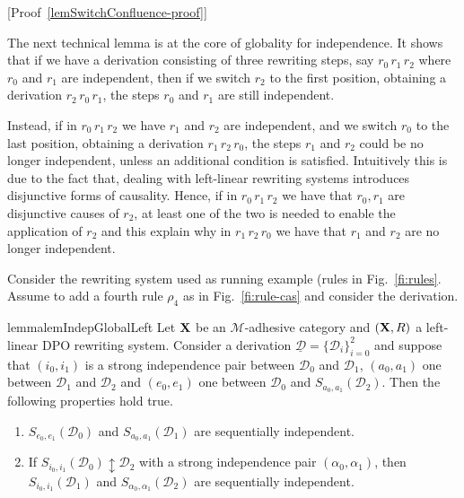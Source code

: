\documentclass[a4paper,UKenglish,cleveref,pdftex, thm-restate,numberwithinsect,anonymous]{lipics}
\def\R{\mathsf{R}}
\def\X{\textbf {\textup{X}}}
\newcommand{\dder}[1]{\mathscr{#1}}
\newcommand{\der}[1]{\underline{\dder{#1}}}
\newcommand{\seqind}{\ensuremath{\updownarrow}}
\begin{document}
[Proof~\ref{lemSwitchConfluence-proof}]


The next technical lemma is at the core of globality for independence. It shows that if we have a derivation consisting of three
rewriting steps, say $r_0\, r_1\, r_2$ where $r_0$ and $r_1$ are independent, then if we switch $r_2$ to the first position, 
obtaining a derivation $r_2\, r_0\, r_1$, the steps $r_0$ and $r_1$ are still independent.

Instead, if in $r_0\, r_1\, r_2$ we have $r_1$ and $r_2$ are
independent, and we switch $r_0$ to the last position, obtaining a
derivation $r_1\, r_2\, r_0$, the steps $r_1$ and $r_2$ could be no
longer independent, unless an additional condition is
satisfied. Intuitively this is due to the fact that, dealing with
left-linear rewriting systems introduces disjunctive forms of
causality. Hence, if in $r_0\, r_1\, r_2$ we have that $r_0, r_1$ are
disjunctive causes of $r_2$, at least one of the two is needed to
enable the application of $r_2$ and this explain why in
$r_1\, r_2\, r_0$ we have that $r_1$ and $r_2$ are no longer
independent.

\begin{example}
  Consider the rewriting system used as running example (rules in
  Fig.~\ref{fi:rules}. Assume to add a fourth rule $\rho_4$ as in
  Fig.~\ref{fi:rule-cas} and consider the derivation.
\end{example}

\begin{restatable}{lemma}{lemIndepGlobalLeft}
  \label{lem:indep-global-left}
  Let $\X$ be an $\mathcal{M}$-adhesive category and
  $(\X,\R)$ a left-linear DPO rewriting system.
  Consider a derivation
  $\der{D}=\{\dder{D}_i\}_{i=0}^2$ and suppose that $(i_0,i_1)$ is a
  strong independence pair between $\dder{D}_0$ and $\dder{D}_1$,
  $(a_0,a_1)$ one between $\dder{D}_1$ and $\dder{D}_2$ and
  $(e_0, e_1)$ one between $\dder{D}_0$ and
  $S_{a_0,a_1}(\dder{D}_2)$. Then the following properties hold true.
  \begin{enumerate}
  \item
    \label{lem:indep-global-left:1}
    $S_{e_0,e_1}(\dder{D}_0)$ and $S_{a_0,a_1}(\dder{D}_1)$ are
    sequentially independent.
    
  \item
    \label{lem:indep-global-left:2}
    If $S_{i_0, i_1}(\dder{D}_0)\seqind \dder{D}_2$ with a
    strong independence pair $(\alpha_0, \alpha_1)$, then
    $S_{i_0,i_1}(\dder{D}_1)$ and $S_{\alpha_0, \alpha_1}(\dder{D}_2)$
    are  sequentially independent.
  \end{enumerate}
\end{restatable}
\end{document}
